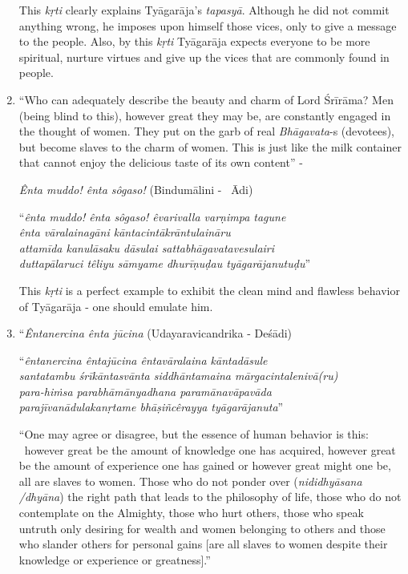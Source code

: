 \begin{enumerate}
 This \textit{kṛti} clearly explains Tyāgarāja’s \textit{tapasyā}. Although he did not commit anything wrong, he imposes upon himself those vices, only to give a message to the people. Also, by this \textit{kṛti} Tyāgarāja expects everyone to be more spiritual, nurture virtues and give up the vices that are commonly found in people.

 \item 
 “Who can adequately describe the beauty and charm of Lord Śrīrāma? Men (being blind to this), however great they may be, are constantly engaged in the thought of women. They put on the garb of real \textit{Bhāgavata}-s (devotees), but become slaves to the charm of women. This is just like the milk container that cannot enjoy the delicious taste of its own content” -

 \textit{Ênta muddo! ênta sôgaso!} (Bindumālini -  Ādi)

\begin{longquote}
“\textit{ênta muddo! ênta sôgaso! êvarivalla varṇimpa tagune}\\ \textit{ênta vāralainagāni kāntacintākrāntulaināru}\\ \textit{attamīda kanulāsaku dāsulai sattabhāgavatavesulairi}\\\textit{duttapālaruci têliyu sāmyame dhurīṇuḍau tyāgarājanutuḍu}”
\end{longquote}

 This \textit{kṛti} is a perfect example to exhibit the clean mind and flawless behavior of Tyāgarāja - one should emulate him.

 \item 
 “\textit{Êntanercina ênta jūcina} (Udayaravicandrika - Deśādi)

\begin{longquote}
“\textit{êntanercina êntajūcina êntavāralaina kāntadāsule}\\ \textit{santatambu śrīkāntasvānta siddhāntamaina mārgacintalenivā(ru)}\\ \textit{para-hiṁsa parabhāmānyadhana paramānavāpavāda} \\ \textit{parajīvanādulakanṛtame bhāṣiñcêrayya tyāgarājanuta}”
\end{longquote}

 “One may agree or disagree, but the essence of human behavior is this:  however great be the amount of knowledge one has acquired, however great be the amount of experience one has gained or however great might one be, all are slaves to women. Those who do not ponder over (\textit{nididhyāsana /dhyāna}) the right path that leads to the philosophy of life, those who do not contemplate on the Almighty, those who hurt others, those who speak untruth only desiring for wealth and women belonging to others and those who slander others for personal gains [are all slaves to women despite their knowledge or experience or greatness].”


\end{enumerate}
